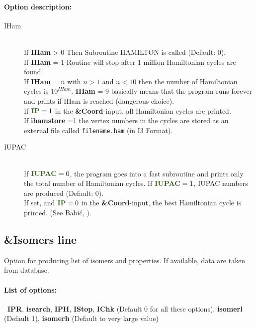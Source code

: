 \documentclass[article,a4paper,twoside]{memoir}
\newcommand{\filename}[1]{\texttt{#1}}
\newcommand{\paramname}[1]{{\color{green}\textbf{#1}}}
\begin{document}
\paragraph{Option description:}
\begin{description}
\item[IHam] \ \\
  If \paramname{IHam} > 0 Then Subroutine HAMILTON is called (Default: 0).\\
  If \paramname{IHam} = 1 Routine will stop after 1 million Hamiltonian cycles are found.\\
  If \paramname{IHam} = $n$ with $n > 1$ and $n < 10$ then the number of Hamiltonian cycles is $10^{IHam}$. \paramname{IHam} = 9 basically means that
  the program runs forever and prints if IHam is reached (dangerous choice).\\
  If $\paramname{IP} = 1$ in the \paramname{\&Coord}-input, all Hamiltonian cycles are printed.\\
  If \paramname{ihamstore} =1 the vertex numbers in the cycles are stored as an external file called \filename{filename.ham} (in I3 Format).
  
\item[IUPAC]\ \\ 
  If $\paramname{IUPAC} = 0$, the program goes into a fast subroutine and prints only the total number of Hamiltonian cycles.  If $\paramname{IUPAC} = 1$, IUPAC numbers are produced  
   (Default: 0).\\
  If set, and $\paramname{IP} = 0$ in the \paramname{\&Coord}-input, the best Hamiltonian cycle is printed.
  (See Babi\'c,  \cite{Babic1995a}).\\
\end{description}


\subsection{\&Isomers line}
 Option for producing list of isomers and properties. If available, data are taken from database.
\paragraph{List of options:}\ \paramname{IPR}, \paramname{isearch}, \paramname{IPH}, \paramname{IStop}, \paramname{IChk} (Default 0 for all these options),
\paramname{isomerl} (Default 1), \paramname{isomerh} (Default to very large value)\\
\end{document}
